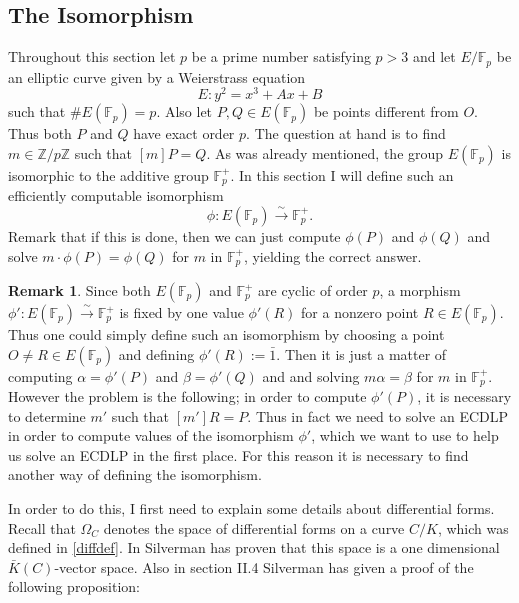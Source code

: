 \documentclass{article}
\numberwithin{equation}{section}
\theoremstyle{definition}
\newtheorem{remark}[theorem]{Remark}
\newcommand{\ZZ}{{\mathbb Z}} %
\newcommand{\Zmod}[1]{\ZZ / #1\ZZ} %
\newcommand{\FF}[1]{{\mathbb F}_{#1}} %
\begin{document}
\subsection{The Isomorphism}\label{Semaevattack}
Throughout this section let $p$ be a prime number satisfying $p>3$ and let $E/\FF{p}$ be an elliptic curve given by a Weierstrass equation $$E:y^2=x^3+Ax+B$$ such that $\#E(\FF{p})=p$. Also let $P,Q \in E(\FF{p})$ be points different from $O$. Thus both $P$ and $Q$ have exact order $p$. The question at hand is to find $m \in \Zmod{p}$ such that $[m]P=Q$. As was already mentioned, the group $E(\FF{p})$ is isomorphic to the additive group $\FF{p}^+$. In this section I will define such an efficiently computable isomorphism $$\phi: E(\FF{p}) \overset{\sim}{\rightarrow} \FF{p}^+.$$ Remark that if this is done, then we can just compute $\phi(P)$ and $\phi(Q)$ and solve $m\cdot\phi(P)=\phi(Q)$ for $m$ in $\FF{p}^+$, yielding the correct answer. 

\begin{remark}
Since both $E(\FF{p})$ and $\FF{p}^+$ are cyclic of order $p$, a morphism $\phi':E(\FF{p}) \overset{\sim}{\rightarrow} \FF{p}^+$ is fixed by one value $\phi'(R)$ for a nonzero point $R\in E(\FF{p})$. Thus one could simply define such an isomorphism by choosing a point $O\neq R \in E(\FF{p})$ and defining $\phi'(R):=\bar{1}$. Then it is just a matter of computing $\alpha=\phi'(P)$ and $\beta=\phi'(Q)$ and and solving $m\alpha=\beta$ for $m$ in $\FF{p}^+$. However the problem is the following; in order to compute $\phi'(P)$, it is necessary to determine $m'$ such that $[m']R=P$. Thus in fact we need to solve an ECDLP in order to compute values of the isomorphism $\phi'$, which we want to use to help us solve an ECDLP in the first place. For this reason it is necessary to find another way of defining the isomorphism. 
\end{remark}

In order to do this, I first need to explain some details about differential forms. Recall that $\Omega_C$ denotes the space of differential forms on a curve $C/K$, which was defined in \ref{diffdef}. In \cite[II.4.2]{Silverman} Silverman has proven that this space is a one dimensional $\bar{K}(C)$-vector space. Also in section II.4 Silverman has given a proof of the following proposition:
\end{document}
